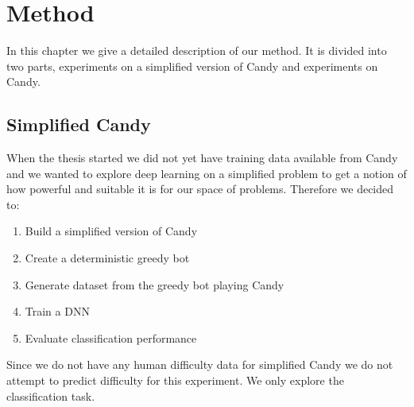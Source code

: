 \documentclass{kththesis}
\begin{document}
\chapter{Method}
In this chapter we give a detailed description of our method. It is divided into two parts, experiments on a simplified version of Candy and experiments on Candy.

\section{Simplified Candy}
When the  thesis started we did not yet have training data available from Candy and we wanted to  explore deep learning on a simplified problem  to get a notion of how powerful and suitable it is for our space of problems. Therefore we decided to:
\begin{enumerate}
\item Build a simplified version of Candy
\item Create a deterministic greedy bot
\item Generate dataset from the greedy bot playing Candy
\item Train a DNN
\item Evaluate classification performance
\end{enumerate}

Since we do not have any human difficulty data for simplified Candy we do not attempt to predict difficulty for this experiment. We only explore the classification task.
\end{document}
